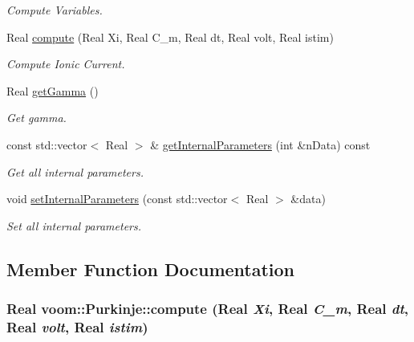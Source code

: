 \begin{DoxyCompactItemize}
\begin{DoxyCompactList}\small\item\em Compute Variables. \item\end{DoxyCompactList}\item 
Real \hyperlink{classvoom_1_1_purkinje_a4d2cb40117d23cf088c3aba0090f7ace}{compute} (Real Xi, Real C\_\-m, Real dt, Real volt, Real istim)
\begin{DoxyCompactList}\small\item\em Compute Ionic Current. \item\end{DoxyCompactList}\item 
Real \hyperlink{classvoom_1_1_purkinje_a337aa8f4b1ea0bd6f08635950cc39a2d}{getGamma} ()
\begin{DoxyCompactList}\small\item\em Get gamma. \item\end{DoxyCompactList}\item 
\hypertarget{classvoom_1_1_purkinje_ac197f0e67a44a616f1cdac4a44a5af46}{
const std::vector$<$ Real $>$ \& \hyperlink{classvoom_1_1_purkinje_ac197f0e67a44a616f1cdac4a44a5af46}{getInternalParameters} (int \&nData) const }
\label{classvoom_1_1_purkinje_ac197f0e67a44a616f1cdac4a44a5af46}

\begin{DoxyCompactList}\small\item\em Get all internal parameters. \item\end{DoxyCompactList}\item 
\hypertarget{classvoom_1_1_purkinje_a0a60901fc4ece5ba12695acad4ff37fd}{
void \hyperlink{classvoom_1_1_purkinje_a0a60901fc4ece5ba12695acad4ff37fd}{setInternalParameters} (const std::vector$<$ Real $>$ \&data)}
\label{classvoom_1_1_purkinje_a0a60901fc4ece5ba12695acad4ff37fd}

\begin{DoxyCompactList}\small\item\em Set all internal parameters. \item\end{DoxyCompactList}\end{DoxyCompactItemize}


\subsection{Member Function Documentation}
\hypertarget{classvoom_1_1_purkinje_a4d2cb40117d23cf088c3aba0090f7ace}{
\subsubsection[{compute}]{\setlength{\rightskip}{0pt plus 5cm}Real voom::Purkinje::compute (Real {\em Xi}, \/  Real {\em C\_\-m}, \/  Real {\em dt}, \/  Real {\em volt}, \/  Real {\em istim})}}
\label{classvoom_1_1_purkinje_a4d2cb40117d23cf088c3aba0090f7ace}


